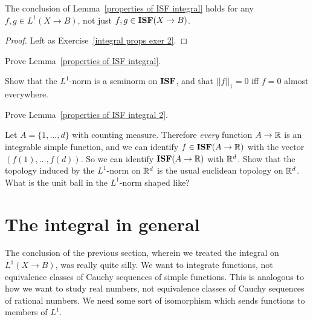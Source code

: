 \begin{lemma}
\label{properties of ISF integral 2}
The conclusion of Lemma~\ref{properties of ISF integral} holds for any $f,g \in L^1(X \to B)$, not just $f,g \in \mathbf{ISF}(X \to B)$.
\end{lemma}
\begin{proof}
Left as Exercise~\ref{integral props exer 2}.
\end{proof}

\begin{exercise}
\label{integral props exer 1}
Prove Lemma~\ref{properties of ISF integral}.
\end{exercise}

\begin{exercise}
\label{L1 norm exer}
Show that the $L^1$-norm is a seminorm on $\mathbf{ISF}$, and that $||f||_1 = 0$ iff $f = 0$ almost everywhere.
\end{exercise}

\begin{exercise}
\label{integral props exer 2}
Prove Lemma~\ref{properties of ISF integral 2}.
\end{exercise}

\begin{exercise}
Let $A = \{1, \dots, d\}$ with counting measure. Therefore \emph{every} function $A \to \mathbb{R}$ is an integrable simple function, and we can identify $f \in \mathbf{ISF}(A \to \mathbb{R})$ with the vector $(f(1), \dots, f(d))$.
So we can identify $\mathbf{ISF}(A \to \mathbb{R})$ with $\mathbb{R}^d$.
Show that the topology induced by the $L^1$-norm on $\mathbb{R}^d$ is the usual euclidean topology on $\mathbb{R}^d$.
What is the unit ball in the $L^1$-norm shaped like?
\end{exercise}

\section{The integral in general}
The conclusion of the previous section, wherein we treated the integral on $L^1(X \to B)$, was really quite silly.
We want to integrate functions, not equivalence classes of Cauchy sequences of simple functions.
This is analogous to how we want to study real numbers, not equivalence classes of Cauchy sequences of rational numbers.
We need some sort of isomorphism which sends functions to members of $L^1$.

